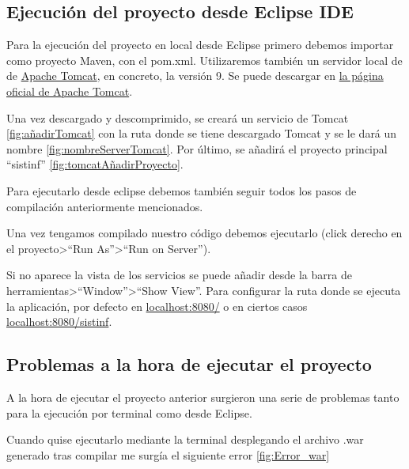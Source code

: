 \subsection{Ejecución del proyecto desde Eclipse IDE}

Para la ejecución del proyecto en local desde Eclipse primero debemos importar como proyecto Maven, con el pom.xml. Utilizaremos también un servidor local de de \href{https://tomcat.apache.org/i}{Apache Tomcat}, en concreto, la versión 9. Se puede descargar en \href{https://tomcat.apache.org/download-90.cgi}{la página oficial de Apache Tomcat}.


Una vez descargado y descomprimido, se creará un servicio de Tomcat \ref{fig:añadirTomcat} con la ruta donde se tiene descargado Tomcat y se le dará un nombre \ref{fig:nombreServerTomcat}. Por último, se añadirá el proyecto principal ``sistinf'' \ref{fig:tomcatAñadirProyecto}.


Para ejecutarlo desde eclipse debemos también seguir todos los pasos de compilación anteriormente mencionados.

Una vez tengamos compilado nuestro código debemos ejecutarlo (click derecho en el proyecto>``Run As''>``Run on Server'').

Si no aparece la vista de los servicios se puede añadir desde la barra de herramientas>``Window''>``Show View''. Para configurar la ruta donde se ejecuta la aplicación, por defecto en \href{http://localhost:8080/}{localhost:8080/} o en ciertos casos \href{http://localhost:8080/sistinf}{localhost:8080/sistinf}.

\subsection{Problemas a la hora de ejecutar el proyecto}

A la hora de ejecutar el proyecto anterior surgieron una serie de problemas tanto para la ejecución por terminal como desde Eclipse.

Cuando quise ejecutarlo mediante la terminal desplegando el archivo .war generado tras compilar me surgía el siguiente error \ref{fig:Error_war}


